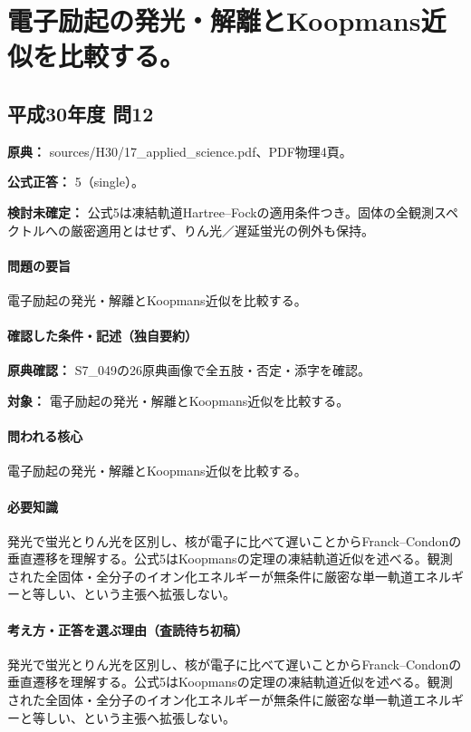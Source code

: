 \section{電子励起の発光・解離とKoopmans近似を比較する。}

\subsection{平成30年度 問12}
\label{q:h30-reg-applied-12}

\noindent\textbf{原典：} sources/H30/17\_applied\_science.pdf、PDF物理4頁。

\textbf{公式正答：} 5（single）。

\par\textbf{検討未確定：} 公式5は凍結軌道Hartree–Fockの適用条件つき。固体の全観測スペクトルへの厳密適用とはせず、りん光／遅延蛍光の例外も保持。

\paragraph{問題の要旨} 電子励起の発光・解離とKoopmans近似を比較する。

\paragraph{確認した条件・記述（独自要約）}\mbox{}\par

\noindent\textbf{原典確認：} S7\_049の26原典画像で全五肢・否定・添字を確認。\par

\noindent\textbf{対象：} 電子励起の発光・解離とKoopmans近似を比較する。\par

\paragraph{問われる核心} 電子励起の発光・解離とKoopmans近似を比較する。

\paragraph{必要知識} 発光で蛍光とりん光を区別し、核が電子に比べて遅いことからFranck–Condonの垂直遷移を理解する。公式5はKoopmansの定理の凍結軌道近似を述べる。観測された全固体・全分子のイオン化エネルギーが無条件に厳密な単一軌道エネルギーと等しい、という主張へ拡張しない。

\paragraph{考え方・正答を選ぶ理由（査読待ち初稿）} 発光で蛍光とりん光を区別し、核が電子に比べて遅いことからFranck–Condonの垂直遷移を理解する。公式5はKoopmansの定理の凍結軌道近似を述べる。観測された全固体・全分子のイオン化エネルギーが無条件に厳密な単一軌道エネルギーと等しい、という主張へ拡張しない。

